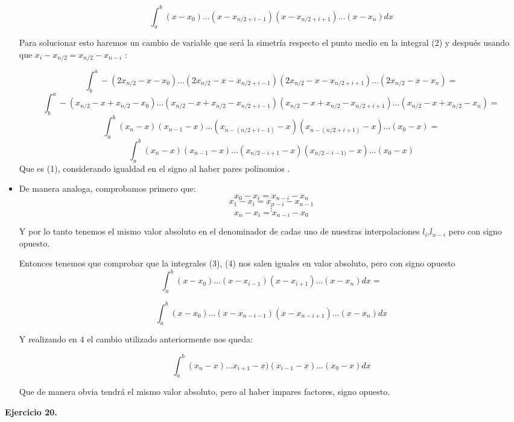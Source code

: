 \documentclass[11pt]{article}
\begin{document}
\begin{itemize}
 \begin{equation}
  \int_a^b (x-x_0)...(x-x_{n/2+i-1}) (x-x_{n/2+i+1}) ... (x-x_n)dx
\end{equation}

 Para solucionar esto haremos un cambio de variable que será la simetría respecto el punto medio en la integral (2) y después usando que $x_i - x_{n/2} = x_{n/2}-x_{n-i}$ :

 $$\int_b^a - (2x_{n/2}-x-x_0) ...(2x_{n/2}-x-x_{n/2+i-1}) (2x_{n/2}-x-x_{n/2+i+1})...(2x_{n/2}-x-x_n) = $$
 $$\int_b^a - (x_{n/2}-x+x_{n/2}-x_0) ...(x_{n/2}-x+x_{n/2}-x_{n/2+i-1}) (x_{n/2}-x+x_{n/2}-x_{n/2+i+1})...(x_{n/2}-x+x_{n/2}-x_n) = $$
 $$\int_a^b (x_n-x)(x_{n-1}-x) ...(x_{n-(n/2+i-1)}-x) (x_{n-(n/2+i+1)}-x)...(x_0-x) = $$
 $$\int_a^b (x_n-x)(x_{n-1}-x) ...(x_{n/2-i+1}-x) (x_{n/2-i-1)}-x)...(x_0-x)$$
  Que es (1), considerando igualdad en el signo al haber pares polinomios .

  \item De manera analoga, comprobamos primero que:
  $$ x_0  - x_i = x_{n-i} - x_n $$
  $$ x_1  - x_i = x_{n-i} - x_{n-1} $$
 $$ \vdots$$
  $$ x_n  - x_i = x_{n-i} - x_0 $$

 Y por lo tanto tenemos el mismo valor absoluto en el denominador de cadas uno de nuestras interpolaciones $l_i$,$l_{n-i}$ pero con signo opuesto.

 Entonces tenemos que comprobar que la integrales (3), (4) nos salen iguales en valor absoluto, pero con signo opuesto
  \begin{equation}
 \int_a^b (x-x_0)...(x-x_{i-1}) (x-x_{i+1}) ... (x-x_n)dx =
 \end{equation}

 \begin{equation}
  \int_a^b (x-x_0)...(x-x_{n-i-1}) (x-x_{n-i+1}) ... (x-x_n)dx
\end{equation}

Y realizando en 4 el cambio utilizado anteriormente nos queda:

$$  \int_a^b (x_n-x)...x_{i+1}-x) (x_{i-1}-x) ... (x_0-x)dx $$

Que de manera obvia tendrá el mismo valor absoluto, pero al haber impares factores, signo opuesto.

\end{itemize}

\textbf{Ejercicio 20.}
\end{document}
